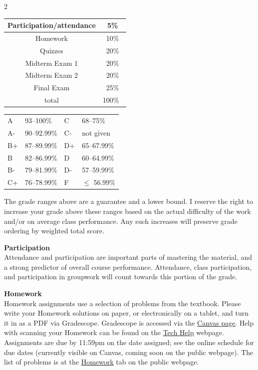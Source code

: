 \documentclass[12pt]{article}
\renewcommand{\emph}[1]{\textsf{\textbf{#1}}}
\newcommand{\localhead}[1]{\par\smallskip\textbf{#1} \smallskip\nobreak\\}%
\def\heading#1{\localhead{\large\emph{#1}}}
\begin{document}
\begin{multicols}{2}
\begin{tabular}{|c|c|}
\hline
Participation/attendance & 5\%\\
\hline
Homework & 10\% \\
\hline
Quizzes & 20\% \\
\hline
Midterm Exam 1 & 20\% \\
\hline
Midterm Exam 2 & 20\%  \\
\hline
Final Exam & 25\% \\
\hline
total & 100\% \, \\
\hline
\end{tabular}


\begin{tabular}{llll}
A  & 93--100\%& C  & 68--75\%  \\
A- & 90--92.99\% & C- & not given \\
B+ & 87--89.99\% & D+ & 65--67.99\%  \\
B  & 82--86.99\% & D  & 60--64.99\%  \\
B- & 79--81.99\% & D- & 57--59.99\%  \\
C+ & 76--78.99\% & F  & $\le$ 56.99\%
\end{tabular}
\end{multicols}

The grade ranges above are a guarantee and a lower bound. I reserve
the right to increase your grade above these ranges based on the
actual difficulty of the work and/or on average class performance.
Any such increases will preserve grade ordering by weighted total
score.


\heading{Participation}
Attendance and participation are important parts of mastering the
material, and a strong predictor of overall course performance.
Attendance, class participation, and participation in groupwork will
count towards this portion of the grade.

\newpage

\heading{Homework}
Homework assignments use a selection of problems from the textbook.
Please write your Homework solutions on paper, or electronically on a
tablet, and turn it in as a PDF via Gradescope.  Gradescope is
accessed via the \href{https://canvas.alaska.edu/courses/31682}{Canvas
page}.  Help with scanning your Homework can be found on the
\href{https://uaf-math.github.io/calc2/techHelp.html}{Tech Help}
webpage.  Assignments are due by 11:59pm on the date assigned; see the
online 
schedule
for due dates (currently visible on Canvas, coming soon on the public webpage).  The list of problems is at the
\href{https://uaf-math.github.io/calc2/homework.html}{Homework} tab
on the public webpage.
\end{document}
